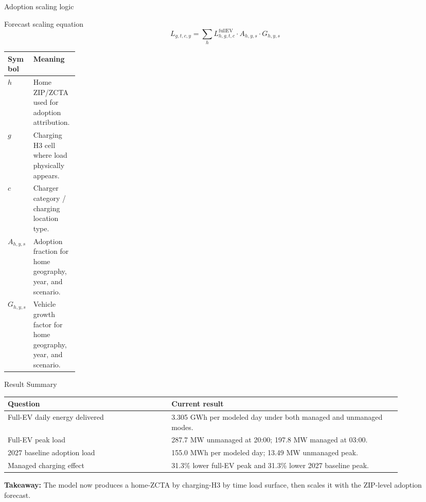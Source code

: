 \documentclass[aspectratio=169]{beamer}
\newcommand{\mw}{\mathrm{MW}}
\newcommand{\mwh}{\mathrm{MWh}}
\newcommand{\gwh}{\mathrm{GWh}}
\newcommand{\takeaway}[1]{\vspace{0.5em}\textcolor{evblue}{\textbf{Takeaway:}} #1}
\begin{document}
\begin{frame}{Adoption scaling logic}
\small
\begin{block}{Forecast scaling equation}
\[
L_{g,t,c,y} = \sum_h L^{\text{fullEV}}_{h,g,t,c}
\cdot A_{h,y,s} \cdot G_{h,y,s}
\]
\end{block}

\begin{tabularx}{\linewidth}{p{0.16\linewidth}Y}
\toprule
\textbf{Symbol} & \textbf{Meaning} \\
\midrule
$h$ & Home ZIP/ZCTA used for adoption attribution. \\
$g$ & Charging H3 cell where load physically appears. \\
$c$ & Charger category / charging location type. \\
$A_{h,y,s}$ & Adoption fraction for home geography, year, and scenario. \\
$G_{h,y,s}$ & Vehicle growth factor for home geography, year, and scenario. \\
\bottomrule
\end{tabularx}
\end{frame}

\begin{frame}{Result Summary}
\small
\begin{tabular}{p{0.37\linewidth}p{0.52\linewidth}}
\toprule
\textbf{Question} & \textbf{Current result} \\
\midrule
Full-EV daily energy delivered & 3.305 \(\gwh\) per modeled day under both managed and unmanaged modes. \\
Full-EV peak load & 287.7 \(\mw\) unmanaged at 20:00; 197.8 \(\mw\) managed at 03:00. \\
2027 baseline adoption load & 155.0 \(\mwh\) per modeled day; 13.49 \(\mw\) unmanaged peak. \\
Managed charging effect & 31.3\% lower full-EV peak and 31.3\% lower 2027 baseline peak. \\
\bottomrule
\end{tabular}

\takeaway{The model now produces a home-ZCTA by charging-H3 by time load surface, then scales it with the ZIP-level adoption forecast.}
\end{frame}
\end{document}
